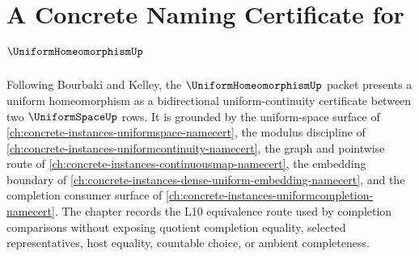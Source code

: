 \chapter{A Concrete Naming Certificate for $\UniformHomeomorphismUp$}
\label{ch:concrete-instances-uniformhomeomorphism-namecert}

Following Bourbaki and Kelley, the $\UniformHomeomorphismUp$ packet presents a uniform homeomorphism as a bidirectional uniform-continuity certificate between two $\UniformSpaceUp$ rows. It is grounded by the uniform-space surface of \autoref{ch:concrete-instances-uniformspace-namecert}, the modulus discipline of \autoref{ch:concrete-instances-uniformcontinuity-namecert}, the graph and pointwise route of \autoref{ch:concrete-instances-continuousmap-namecert}, the embedding boundary of \autoref{ch:concrete-instances-dense-uniform-embedding-namecert}, and the completion consumer surface of \autoref{ch:concrete-instances-uniformcompletion-namecert}. The chapter records the L10 equivalence route used by completion comparisons without exposing quotient completion equality, selected representatives, host equality, countable choice, or ambient completeness.

